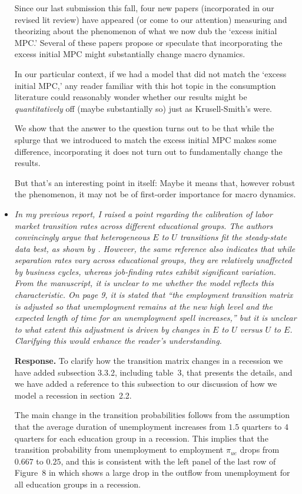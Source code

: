 \documentclass[12pt,letterpaper,english]{article}
\begin{document}
\begin{itemize}
	Since our last submission this fall, four new papers (incorporated in our revised lit review) have appeared (or come to our attention) measuring and theorizing about the phenomenon of what we now dub the `excess initial MPC.'  Several of these papers propose or speculate that incorporating the excess initial MPC might substantially change macro dynamics.
	
	In our particular context, if we had a model that did not match the `excess initial MPC,' any reader familiar with this hot topic in the consumption literature could reasonably wonder whether our results might be \textit{quantitatively} off (maybe substantially so) just as Krusell-Smith's were.
	
	We show that the answer to the question turns out to be that while the splurge that we introduced to match the excess initial MPC makes some difference, incorporating it does not turn out to fundamentally change the results.
	
	But that's an interesting point in itself: Maybe it means that, however robust the phenomenon, it may not be of first-order importance for macro dynamics.
	
	\item \textit{In my previous report, I raised a point regarding the calibration of labor market transition rates across different educational groups. The authors convincingly argue that heterogeneous $E$ to $U$ transitions fit the steady-state data best, as shown by \citet{elsby2010labor}. However, the same reference also indicates that while separation rates vary across educational groups, they are relatively unaffected by business cycles, whereas job-finding rates exhibit significant variation. From the manuscript, it is unclear to me whether the model reflects this characteristic. On page 9, it is stated that ``the employment transition matrix is adjusted so that unemployment remains at the new high level and the expected length of time for an unemployment spell increases,'' but it is unclear to what extent this adjustment	is driven by changes in $E$ to $U$ versus $U$ to $E$. Clarifying this would enhance the reader’s understanding.}	
	
	\noindent \textbf{Response.} To clarify how the transition matrix changes in a recession we have added subsection 3.3.2, including table~3, that presents the details, and we have added a reference to this subsection to our discussion of how we model a recession in section~2.2. 
	
	The main change in the transition probabilities follows from the assumption that the average duration of unemployment increases from $1.5$ quarters to $4$ quarters for each education group in a recession. This implies that the transition probability from unemployment to employment $\pi_{ue}$ drops from $0.667$ to $0.25$, and this is consistent with the left panel of the last row of Figure~8 in \citet{elsby2010labor} which shows a large drop in the outflow from unemployment for all education groups in a recession. 
	

\end{itemize}
\end{document}
